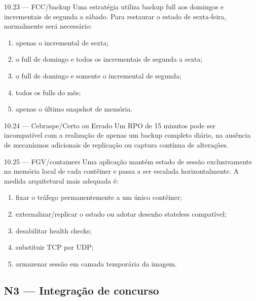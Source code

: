 \begin{questao}{ 10.23 — FCC/backup}
Uma estratégia utiliza backup full aos domingos e incrementais de segunda a sábado. Para restaurar o estado de sexta-feira, normalmente será necessário:
\begin{enumerate}[label=\Alph*)]
\item apenas o incremental de sexta;
\item o full de domingo e todos os incrementais de segunda a sexta;
\item o full de domingo e somente o incremental de segunda;
\item todos os fulls do mês;
\item apenas o último snapshot de memória.
\end{enumerate}
\end{questao}

\begin{questao}{ 10.24 — Cebraspe/Certo ou Errado}
Um RPO de 15 minutos pode ser incompatível com a realização de apenas um backup completo diário, na ausência de mecanismos adicionais de replicação ou captura contínua de alterações.
\end{questao}

\begin{questao}{ 10.25 — FGV/containers}
Uma aplicação mantém estado de sessão exclusivamente na memória local de cada contêiner e passa a ser escalada horizontalmente. A medida arquitetural mais adequada é:
\begin{enumerate}[label=\Alph*)]
\item fixar o tráfego permanentemente a um único contêiner;
\item externalizar/replicar o estado ou adotar desenho stateless compatível;
\item desabilitar health checks;
\item substituir TCP por UDP;
\item armazenar sessão em camada temporária da imagem.
\end{enumerate}
\end{questao}

\subsection*{N3 — Integração de concurso}

